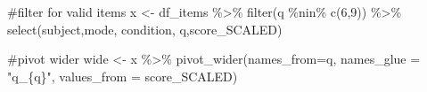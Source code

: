 \documentclass[
  letterpaper,
  DIV=11,
  numbers=noendperiod]{scrreprt}
\newenvironment{Shaded}{\begin{snugshade}}{\end{snugshade}}
\newcommand{\AttributeTok}[1]{\textcolor[rgb]{0.40,0.45,0.13}{#1}}
\newcommand{\CommentTok}[1]{\textcolor[rgb]{0.37,0.37,0.37}{#1}}
\newcommand{\DecValTok}[1]{\textcolor[rgb]{0.68,0.00,0.00}{#1}}
\newcommand{\FunctionTok}[1]{\textcolor[rgb]{0.28,0.35,0.67}{#1}}
\newcommand{\NormalTok}[1]{\textcolor[rgb]{0.00,0.23,0.31}{#1}}
\newcommand{\OtherTok}[1]{\textcolor[rgb]{0.00,0.23,0.31}{#1}}
\newcommand{\SpecialCharTok}[1]{\textcolor[rgb]{0.37,0.37,0.37}{#1}}
\newcommand{\StringTok}[1]{\textcolor[rgb]{0.13,0.47,0.30}{#1}}
\begin{document}
\begin{Shaded}
\begin{Highlighting}[]
\CommentTok{\#filter for valid items}
\NormalTok{x }\OtherTok{\textless{}{-}}\NormalTok{ df\_items }\SpecialCharTok{\%\textgreater{}\%} \FunctionTok{filter}\NormalTok{(q }\SpecialCharTok{\%nin\%} \FunctionTok{c}\NormalTok{(}\DecValTok{6}\NormalTok{,}\DecValTok{9}\NormalTok{)) }\SpecialCharTok{\%\textgreater{}\%} \FunctionTok{select}\NormalTok{(subject,mode, condition, q,score\_SCALED)}

\CommentTok{\#pivot wider}
\NormalTok{wide }\OtherTok{\textless{}{-}}\NormalTok{ x }\SpecialCharTok{\%\textgreater{}\%} \FunctionTok{pivot\_wider}\NormalTok{(}\AttributeTok{names\_from=}\NormalTok{q, }\AttributeTok{names\_glue =} \StringTok{"q\_\{q\}"}\NormalTok{, }\AttributeTok{values\_from =}\NormalTok{ score\_SCALED)}


\end{Highlighting}
\end{Shaded}
\end{document}
